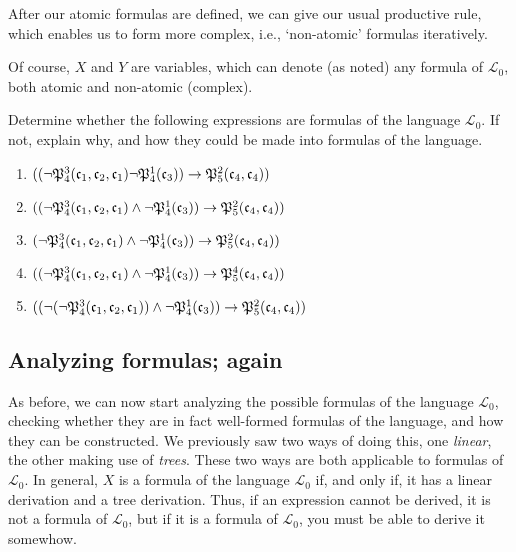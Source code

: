 After our atomic formulas are defined, we can give our usual productive rule, which enables us to form more complex, i.e., `non-atomic' formulas iteratively. 


Of course, $X$ and $Y$ are variables, which can denote (as noted) any formula of $\mathcal{L}_0$, both atomic and non-atomic (complex).

\begin{exc}
Determine whether the following expressions are formulas of the language $\mathcal{L}_0$. If not, explain why, and how they could be made into formulas of the language. 

\begin{enumerate}
	\item $((\neg \mathfrak{P}^{3}_{4}(\mathfrak{c}_{1}, \mathfrak{c}_{2}, \mathfrak{c}_{1}) \neg \mathfrak{P}^{1}_{4}(\mathfrak{c}_{3})) \rightarrow \mathfrak{P}^{2}_{5}(\mathfrak{c}_{4}, \mathfrak{c}_{4}))$
	\item $((\neg \mathfrak{P}^{3}_{4}(\mathfrak{c}_{1}, \mathfrak{c}_{2}, \mathfrak{c}_{1}) \wedge \neg \mathfrak{P}^{1}_{4}(\mathfrak{c}_{3})) \rightarrow \mathfrak{P}^{2}_{5}(\mathfrak{c}_{4}, \mathfrak{c}_{4}))$
	\item $(\neg \mathfrak{P}^{3}_{4}(\mathfrak{c}_{1}, \mathfrak{c}_{2}, \mathfrak{c}_{1}) \wedge \neg \mathfrak{P}^{1}_{4}(\mathfrak{c}_{3})) \rightarrow \mathfrak{P}^{2}_{5}(\mathfrak{c}_{4}, \mathfrak{c}_{4}))$
	\item $((\neg \mathfrak{P}^{3}_{4}(\mathfrak{c}_{1}, \mathfrak{c}_{2}, \mathfrak{c}_{1}) \wedge \neg \mathfrak{P}^{1}_{4}(\mathfrak{c}_{3})) \rightarrow \mathfrak{P}^{4}_{5}(\mathfrak{c}_{4}, \mathfrak{c}_{4}))$
	\item $((\neg(\neg \mathfrak{P}^{3}_{4}(\mathfrak{c}_{1}, \mathfrak{c}_{2}, \mathfrak{c}_{1})) \wedge \neg \mathfrak{P}^{1}_{4}(\mathfrak{c}_{3})) \rightarrow \mathfrak{P}^{2}_{5}(\mathfrak{c}_{4}, \mathfrak{c}_{4}))$
\end{enumerate}
\end{exc}

\subsection{Analyzing formulas; again}

As before, we can now start analyzing the possible formulas of the language $\mathcal{L}_0$, checking whether they are in fact well-formed formulas of the language, and how they can be constructed. We previously saw two ways of doing this, one \textit{linear}, the other making use of \textit{trees}. These two ways are both applicable to formulas of $\mathcal{L}_0$. In general, $X$ is a formula of the language $\mathcal{L}_0$ if, and only if, it has a linear derivation and a tree derivation. Thus, if an expression cannot be derived, it is not a formula of $\mathcal{L}_0$, but if it is a formula of $\mathcal{L}_0$, you must be able to derive it somewhow.

